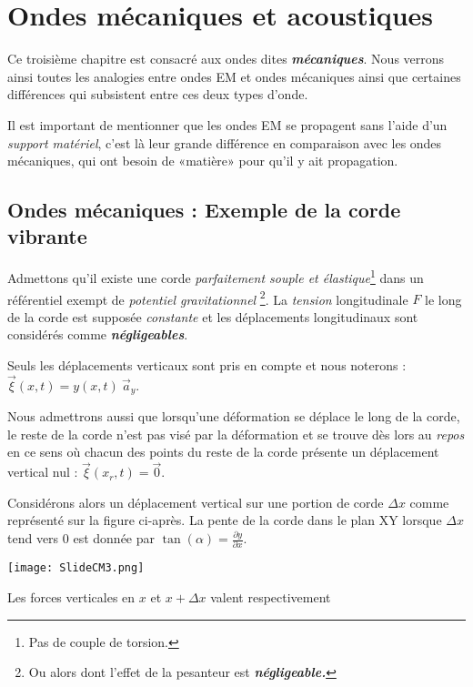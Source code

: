 \chapter{Ondes mécaniques et acoustiques} 

Ce troisième chapitre est consacré aux ondes dites \textit{\textbf{mécaniques}}. Nous verrons ainsi toutes les analogies entre ondes EM et ondes mécaniques ainsi que certaines différences qui subsistent entre ces deux types d'onde.

Il est important de mentionner que les ondes EM se propagent sans l'aide d'un \textit{support matériel}, c'est là leur grande différence en comparaison avec les ondes mécaniques, qui ont besoin de «matière» pour qu'il y ait propagation. 

\section{Ondes mécaniques : Exemple de la corde vibrante}

Admettons qu'il existe une corde \textit{parfaitement souple et élastique}\footnote{Pas de couple de torsion.} dans un référentiel exempt de \textit{potentiel gravitationnel} \footnote{Ou alors dont l'effet de la pesanteur est \textit{\textbf{négligeable.}}}. La \textit{tension} longitudinale $F$ le long de la corde est supposée \textit{constante} et les déplacements longitudinaux sont considérés comme \textit{\textbf{négligeables}}.

Seuls les déplacements verticaux sont pris en compte et nous noterons : $\vec{\xi}(x,t) = y(x,t) \ \vec{a}_{y}$.

Nous admettrons aussi que lorsqu'une déformation se déplace le long de la corde, le reste de la corde n'est pas visé par la déformation et se trouve dès lors au \textit{repos} en ce sens où chacun des points du reste de la corde présente un déplacement vertical nul : $\vec{\xi}(x_{r},t) = \vec{0}$.

Considérons alors un déplacement vertical sur une portion de corde $\Delta x$ comme représenté sur la figure ci-après.  La pente de la corde dans le plan XY lorsque $\Delta x$ tend vers $0$ est donnée par $\tan (\alpha) = \frac{\partial y}{\partial x}$.

\begin{center}
	\texttt{[image: SlideCM3.png]}
\end{center}

Les forces verticales en $x$ et $x+\Delta x$ valent respectivement

